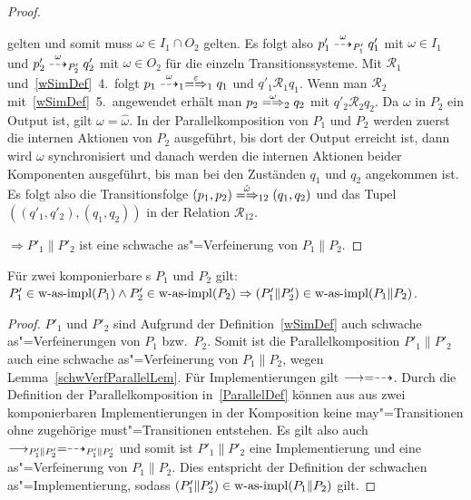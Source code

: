 \begin{proof}
\begin{enumerate}
\begin{itemize}
          gelten und somit muss \oBdA{} $\omega\in I_1\cap O_2$ gelten. Es
          folgt also $p'_1\may[\omega]_{P'_1} q'_1$ mit $\omega\in I_1$ und
          $p'_2\may[\omega]_{P'_2} q'_2$ mit $\omega\in O_2$ für die einzeln
          Transitionssysteme. Mit $\mathcal{R}_1$ und~\ref{wSimDef}~4.\ folgt
          $p_1\may[\omega]_1 \weakmay[\varepsilon]_1 q_1$ und $q'_1
          \mathcal{R}_1 q_1$. Wenn man $\mathcal{R}_2$ mit~\ref{wSimDef}~5.\
          angewendet erhält man $p_2 \weakmay[\omega]_2 q_2$ mit
          $q'_2\mathcal{R}_2 q_2$. Da $\omega$ in $P_2$ ein Output ist, gilt
          $\omega =\hat{\omega}$. In der Parallelkomposition von $P_1$ und
          $P_2$ werden zuerst die internen Aktionen von $P_2$ ausgeführt, bis
          dort der Output erreicht ist, dann wird $\omega$ synchronisiert und
          danach werden die internen Aktionen beider Komponenten ausgeführt,
          bis man bei den Zuständen $q_1$ und $q_2$ angekommen ist. Es folgt
          also die Transitionsfolge $(p_1,p_2) \weakmay[\hat{\omega}]_{12}
          (q_1,q_2)$ und das Tupel $((q'_1,q'_2),(q_1,q_2))$ in der Relation
          $\mathcal{R}_{12}$.
      \end{itemize}
  \end{enumerate}
  $\Rightarrow P'_1\|P'_2$ ist eine schwache as"=Verfeinerung von $P_1\|P_2$.
\end{proof}

\begin{Kor}
  \label{schwImpParallelKor}
  Für zwei komponierbare \MEIO{}s $P_1$ und $P_2$ gilt:
  $P'_1\in\mathrm{w}\text{-}\mathrm{as}\text{-}\mathrm{impl} (P_1) \land P'_2 \in\mathrm{w}\text{-}\mathrm{as}\text{-}\mathrm{impl} (P_2) \Rightarrow (P'_1\|P'_2)
  \in\mathrm{w}\text{-}\mathrm{as}\text{-}\mathrm{impl} (P_1\|P_2)$.
\end{Kor}
\begin{proof}
  $P'_1$ und $P'_2$ sind Aufgrund der Definition~\ref{wSimDef} auch schwache
  as"=Verfeinerungen von $P_1$ bzw.\ $P_2$. Somit ist die Parallelkomposition
  $P'_1\|P'_2$ auch eine schwache as"=Verfeinerung von $P_1\|P_2$, wegen
  Lemma~\ref{schwVerfParallelLem}. Für Implementierungen gilt $\must =\may$.
  Durch die Definition der Parallelkomposition in~\ref{ParallelDef} können aus
  aus zwei komponierbaren Implementierungen in der Komposition keine
  may"=Transitionen ohne zugehörige must"=Transitionen entstehen. Es gilt also
  auch $\must _{P'_1\|P'_2} =\may _{P'_1\|P'_2}$ und somit ist $P'_1\|P'_2$
  eine Implementierung und eine as"=Verfeinerung von $P_1\|P_2$. Dies
  entspricht der Definition der schwachen as"=Implementierung, sodass
  $(P'_1\|P'_2)\in\mathrm{w}\text{-}\mathrm{as}\text{-}\mathrm{impl} (P_1\|P_2)$ gilt.
\end{proof}

